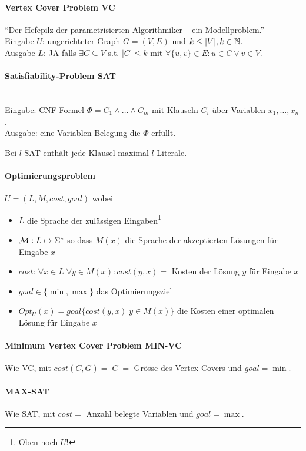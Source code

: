 \paragraph{Vertex Cover Problem VC}
``Der Hefepilz der parametrisierten Algorithmiker -- ein Modellproblem.''
\\
Eingabe $U$: ungerichteter Graph $G = (V, E)$ und $k \leq |V|, k \in \mathbb{N}$. \\
Ausgabe $L$: JA falls $\exists C \subseteq V$ s.t. $|C| \leq k$ mit $\forall \{u, v \} \in E: u \in C \vee v \in V$.

\paragraph{Satisfiability-Problem SAT} \mbox{} \\
Eingabe: CNF-Formel $\Phi = C_1 \wedge \dots \wedge C_m$ mit Klauseln $C_i$ über Variablen $x_1, \dots, x_n$. \\
Ausgabe: eine Variablen-Belegung die $\Phi$ erfüllt.

Bei $l$-SAT enthält jede Klausel maximal $l$ Literale.

\paragraph{Optimierungsproblem}
$U = (L, M, cost, goal)$ wobei
\begin{itemize}
    \item $L$ die Sprache der zulässigen Eingaben\footnote{Oben noch $U$!}
    \item $\mathcal{M}: L \mapsto \Sigma^*$ so dass $M(x)$ die Sprache der akzeptierten Lösungen für Eingabe $x$
    \item $cost$: $\forall x \in L \; \forall y \in M(x) : cost(y, x) = $ Kosten der Lösung $y$ für Eingabe $x$
    \item $goal \in \{ \min, \max \}$ das Optimierungsziel
    \item $Opt_U(x) = goal \{ cost(y, x) | y \in M(x) \}$ die Kosten einer optimalen Lösung für Eingabe $x$
\end{itemize}

\paragraph{Minimum Vertex Cover Problem MIN-VC}
Wie VC, mit $cost(C, G) = |C| = $ Grösse des Vertex Covers und $goal = \min$.

\paragraph{MAX-SAT}
Wie SAT, mit $cost = $ Anzahl belegte Variablen und $goal = \max$.

